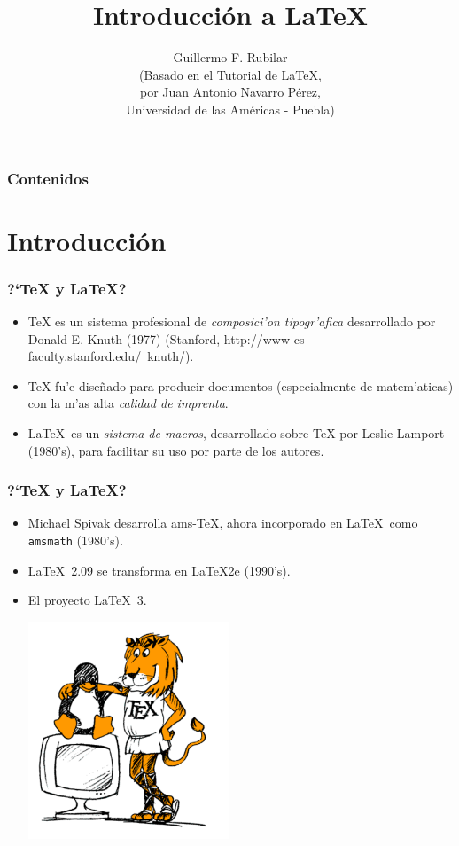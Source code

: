 \documentclass{beamer}
\begin{document}
\title[\LaTeX]{Introducci\'on a \LaTeX}
\author[G.R.]{{Guillermo F. Rubilar} \\ (Basado en el Tutorial de \LaTeX ,\\
por Juan Antonio Navarro P\'{e}rez, \\Universidad de las Am\'{e}ricas - Puebla)}
\frame{\titlepage}


\begin{frame}
\frametitle{Contenidos}
\tableofcontents
\end{frame}


\section{Introducci\'on}
\begin{frame}[fragile]\frametitle{?`\TeX{} y \LaTeX?}
\begin{itemize}
\item \TeX{} es un sistema profesional de \emph{composici'on tipogr'afica} desarrollado
por Donald E. Knuth (1977) (Stanford, http://www-cs-faculty.stanford.edu/~knuth/).
\item \TeX{} fu'e dise\~nado para producir documentos (especialmente de matem'aticas) con
la m'as alta \emph{calidad de imprenta}.
\item \LaTeX\ es un \emph{sistema de macros}, desarrollado sobre \TeX{} por Leslie
Lamport (1980's), para facilitar su uso por parte de los autores.
\end{itemize}
\end{frame}

\begin{frame}[fragile]\frametitle{?`\TeX{} y \LaTeX?}
\begin{itemize}
\item Michael Spivak desarrolla ams-TeX, ahora incorporado en \LaTeX\ como \texttt{amsmath} 
(1980's).
  \item \LaTeX\ 2.09 se transforma en \LaTeX2e (1990's).
  \item El proyecto \LaTeX\ 3. 
	\begin{center}
		\includegraphics[width=6cm]{figs/tux26.pdf}
	\end{center}
\end{itemize}
\end{frame}
\end{document}
